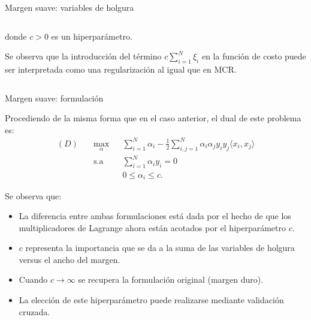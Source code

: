 \documentclass[9pt]{beamer}
\begin{document}
\begin{frame}{Margen suave: variables de holgura}
\begin{columns}
\begin{column}{0.5\textwidth}
donde $c>0$ es un hiperparámetro.\\ \pause

Se observa que la introducción del término $c\sum_{i=1}^{N} \xi_i$ en la función de costo puede ser interpretada como una regularización al igual que en MCR.

\end{column}

\end{columns}

\end{frame}

\begin{frame}{Margen suave: formulación}

Procediendo de la misma forma que en el caso anterior, el dual de este problema es:
\begin{equation*}
\begin{aligned}
(D)\quad & \underset{\alpha}{\text{max}}
& & \sum\limits_{i=1}^{N}\alpha_i - \frac{1}{2} \sum\limits_{i,j=1}^{N} \alpha_i \alpha_j y_i y_j \langle x_i, x_j\rangle\\
& \text{s.a}
& & \sum\limits_{i=1}^{N} \alpha_i y_i= 0 \\
& &  &0 \leq \alpha_i \leq c.
\end{aligned}
\end{equation*}\pause

Se observa que:

\begin{itemize}
	\item La diferencia entre ambas formulaciones está dada por el hecho de que los multiplicadores de Lagrange ahora están acotados por el hiperparámetro $c$.\pause
	\item $c$ representa la importancia que se da a la suma de las variables de holgura versus el ancho del margen.\pause
	\item Cuando $c\to\infty$ se recupera la formulación original (margen duro).\pause
	\item La elección de este hiperparámetro puede realizarse mediante validación cruzada.
\end{itemize}

\end{frame}
\end{document}
